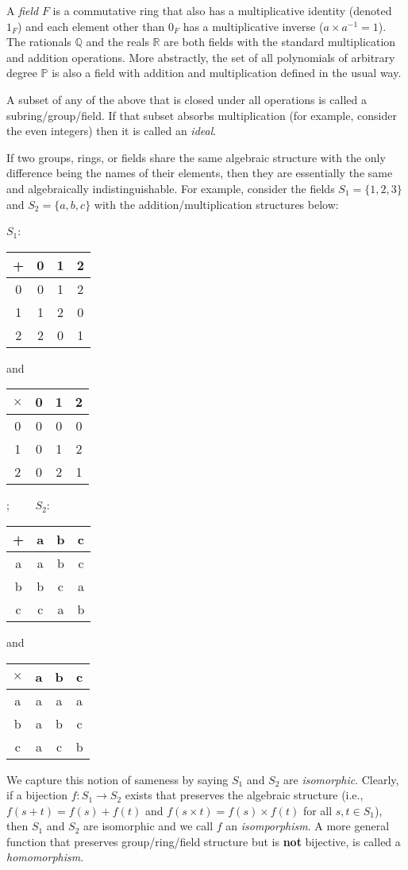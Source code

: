 \documentclass[12pt]{article}
\begin{document}
A {\it field} $F$ is a commutative ring that also has a multiplicative identity
(denoted $1_F$) and each element other than $0_F$ has a multiplicative inverse
($a\times a^{-1} = 1$).
The rationals $\mathbb{Q}$ and the reals $\mathbb{R}$ are both fields with 
the standard multiplication and addition operations.
More abstractly, the set of all polynomials of arbitrary degree $\mathbb{P}$ 
is also a field with addition and multiplication defined in the usual
way.

A subset of any of the above that is closed under all operations is called a
subring/group/field.
If that subset absorbs multiplication (for example, consider the even integers)
then it is called an {\it ideal}.

If two groups, rings, or fields share the same algebraic structure
with the only difference being the names of their elements, then they are 
essentially the same and algebraically indistinguishable.
For example, consider the fields $S_1 = \{1, 2, 3\}$ and $S_2 = \{a, b, c\}$
with the addition/multiplication structures below:

\begin{center}
$S_1$: 
\begin{tabular}{c|ccc}
+ & 0 & 1 & 2 \\
\hline
0 & 0 & 1 & 2 \\
1 & 1 & 2 & 0 \\
2 & 2 & 0 & 1
\end{tabular} and 
\begin{tabular}{c|ccc}
$\times$ & 0 & 1 & 2 \\
\hline
0 & 0 & 0 & 0 \\
1 & 0 & 1 & 2 \\
2 & 0 & 2 & 1
\end{tabular};
$\qquad S_2$: 
\begin{tabular}{c|ccc}
+ & a & b & c \\
\hline
a & a & b & c \\
b & b & c & a \\
c & c & a & b
\end{tabular}
and
\begin{tabular}{c|ccc}
$\times$ & a & b & c \\
\hline
a & a & a & a \\
b & a & b & c \\
c & a & c & b
\end{tabular}
\end{center}

We capture this notion of sameness by saying $S_1$ and $S_2$ 
are {\it isomorphic}.
Clearly, if a bijection $f : S_1 \rightarrow S_2$ exists that preserves
the algebraic structure (i.e., $f(s + t) = f(s) + f(t)$
and $f(s \times t) = f(s) \times f(t)$ for all $s, t \in S_1$), then 
$S_1$ and $S_2$ are isomorphic and we call $f$ an {\it isomporphism}.
A more general function that preserves group/ring/field structure but 
is {\bf not} bijective, is called a {\it homomorphism}.
\end{document}
